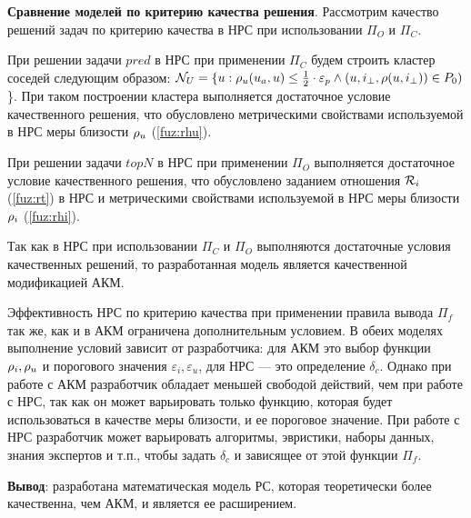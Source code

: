 {\bf Сравнение моделей по критерию качества решения}.
Рассмотрим качество решений задач по критерию качества
в НРС при использовании $\Pi_O$ и $\Pi_C$.

При решении задачи $pred$ в НРС при применении $\Pi_C$
будем строить кластер соседей следующим образом:
$\mathcal{N}_U = \{ u : \mathcal{\rho}_u(u_a, u) \le \frac{1}{2} \cdot \varepsilon_p \wedge
(u, i_{\bot}, \rho(u, i_{\bot})) \in P_0)$ \}.
При таком построении кластера выполняется
достаточное условие качественного решения,
что обусловлено
метрическими свойствами используемой в НРС
меры близости $\mathcal{\rho}_u$ (\ref{fuz:rhu}).

При решении задачи $topN$ в НРС при применении $\Pi_O$
выполняется достаточное условие качественного решения,
что обусловлено заданием отношения $\mathcal{R}_i$ (\ref{fuz:rt})
в НРС и метрическими свойствами используемой в
НРС меры близости $\mathcal{\rho}_i$ (\ref{fuz:rhi}).

Так как в НРС при использовании $\Pi_C$ и $\Pi_O$
выполняются достаточные условия качественных решений, то
разработанная модель является качественной модификацией АКМ.

Эффективность НРС по критерию качества при применении правила
вывода $\Pi_f$ так же, как и в АКМ ограничена
дополнительным условием.
В обеих моделях выполнение условий
зависит от разработчика: для АКМ это выбор функции $\mathcal{\rho}_i, \mathcal{\rho}_u$ и порогового
значения $\varepsilon_i, \varepsilon_u$, для НРС --- это
определение $\delta_c$.
Однако при работе с АКМ
разработчик обладает меньшей свободой действий, чем при работе с
НРС, так как он может варьировать только функцию, которая будет
использоваться в качестве меры близости, и ее пороговое значение.
При работе с НРС разработчик может варьировать
алгоритмы, эвристики, наборы данных, знания
экспертов и т.п., чтобы задать $\delta_c$ и зависящее от этой функции $\Pi_f$.

{\bf Вывод}: разработана математическая модель РС, которая теоретически
более качественна, чем АКМ, и является ее расширением.
